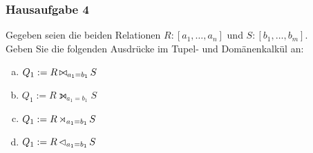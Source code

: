 \begin{frame}
	\frametitle{Hausaufgabe 4}
	\vspace{0.5cm}

	Gegeben seien die beiden Relationen \( R: {[a_1, \hdots, a_n]} \) und \( S: {[b_1, \hdots, b_m]} \). \\
	Geben Sie die folgenden Ausdrücke im Tupel- und Domänenkalkül an:
	\begin{enumerate}[a)]
		\item \( Q_1 := R \operatorname*{\bowtie}_{a_1 = b_1} S \)
		\item \( Q_1 := R \leftouterjoin_{a_1 = b_1} S \)
		\item \( Q_1 := R \operatorname*{\rtimes}_{a_1 = b_1} S \)
		\item \( Q_1 := R \operatorname*{\lhd}_{a_1 = b_1} S \)
	\end{enumerate}
\end{frame}
